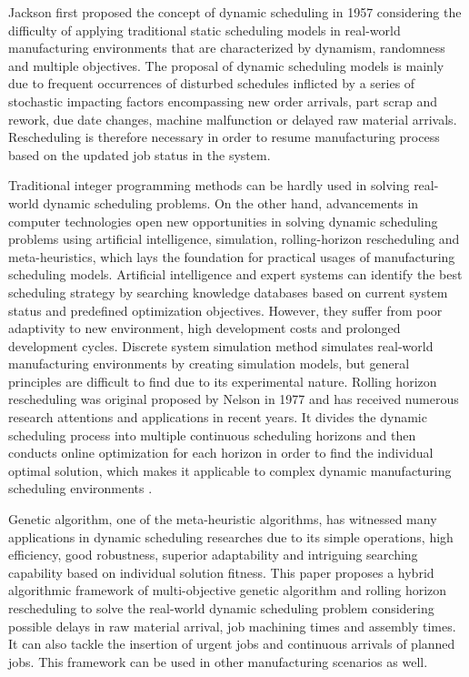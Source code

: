 Jackson first proposed the concept of dynamic scheduling in 1957 considering the difficulty of applying traditional static scheduling models in real-world manufacturing environments that are characterized by dynamism, randomness and multiple objectives. 
The proposal of dynamic scheduling models is mainly due to frequent occurrences of disturbed schedules inflicted by a series of stochastic impacting factors encompassing new order arrivals, part scrap and rework, due date changes, machine malfunction or delayed raw material arrivals.
Rescheduling is therefore necessary in order to resume manufacturing process based on the updated job status in the system.

Traditional integer programming methods can be hardly used in solving real-world dynamic scheduling problems.
On the other hand, advancements in computer technologies open new opportunities in solving dynamic scheduling problems using artificial intelligence, simulation, rolling-horizon rescheduling and meta-heuristics, which lays the foundation for practical usages of manufacturing scheduling models.
Artificial intelligence and expert systems can identify the best scheduling strategy by searching knowledge databases based on current system status and predefined optimization objectives.
However, they suffer from poor adaptivity to new environment, high development costs and prolonged development cycles.
Discrete system simulation method simulates real-world manufacturing environments by creating simulation models, but general principles are difficult to find due to its experimental nature.
Rolling horizon rescheduling was original proposed by Nelson in 1977 and has received numerous research attentions and applications in recent years.
It divides the dynamic scheduling process into multiple continuous scheduling horizons and then conducts online optimization for each horizon in order to find the individual optimal solution, which makes it applicable to complex dynamic manufacturing scheduling environments \citep{bierwirth19991, jian19972}.

Genetic algorithm, one of the meta-heuristic algorithms, has witnessed many applications in dynamic scheduling researches due to its simple operations, high efficiency, good robustness, superior adaptability and intriguing searching capability based on individual solution fitness. 
This paper proposes a hybrid algorithmic framework of multi-objective genetic algorithm and rolling horizon rescheduling to solve the real-world dynamic scheduling problem considering possible delays in raw material arrival, job machining times and assembly times.
It can also tackle the insertion of urgent jobs and continuous arrivals of planned jobs.
This framework can be used in other manufacturing scenarios as well.



















